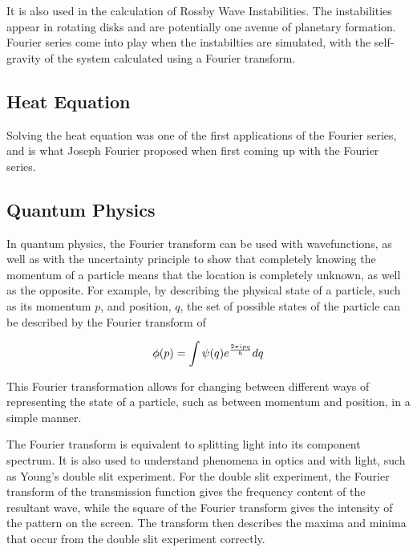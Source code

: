 \documentclass{article}
\begin{document}
It is also used in the calculation of Rossby Wave Instabilities. The instabilities appear in rotating disks and are potentially one avenue of planetary formation. Fourier series come into play when the instabilties are simulated, with the self-gravity of the system calculated using a Fourier transform.\cite{Lovelace}
\subsection{Heat Equation}
Solving the heat equation was one of the first applications of the Fourier series, and is what Joseph Fourier proposed when first coming up with the Fourier series.\cite{FourierHeatSignal}

\subsection{Quantum Physics}
In quantum physics, the Fourier transform can be used with wavefunctions, as well as with the uncertainty principle to show that completely knowing the momentum of a particle means that the location is completely unknown, as well as the opposite. For example, by describing the physical state of a particle, such as its momentum $p$, and position, $q$, the set of possible states of the particle can be described by the Fourier transform of 

$$\phi(p) = \int \psi (q) e^{2\pi i pq\over h} dq$$

This Fourier transformation allows for changing between different ways of representing the state of a particle, such as between momentum and position, in a simple manner. 

The Fourier transform is equivalent to splitting light into its component spectrum. It is also used to understand phenomena in optics and with light, such as Young's double slit experiment. For the double slit experiment, the Fourier transform of the transmission function gives the frequency content of the resultant wave, while the square of the Fourier transform gives the intensity of the pattern on the screen. The transform then describes the maxima and minima that occur from the double slit experiment correctly.\cite{Optics}
\end{document}
